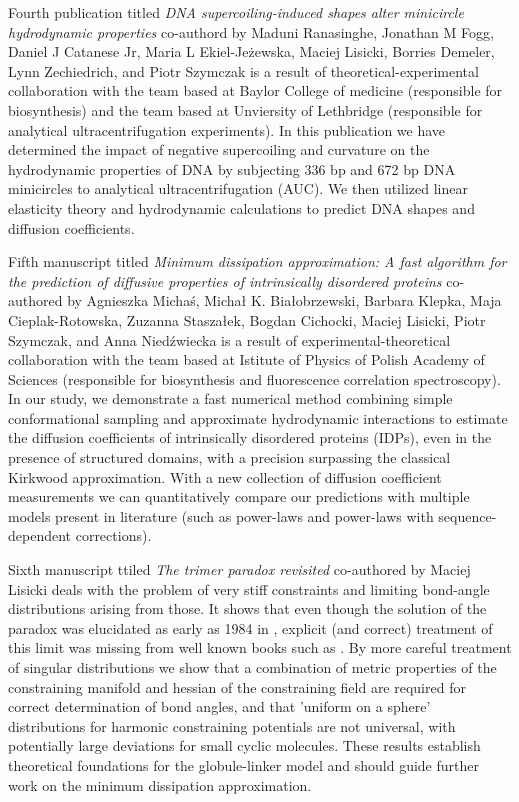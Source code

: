 \documentclass{doctoral}
\begin{document}
Fourth publication titled \emph{DNA supercoiling-induced shapes alter minicircle hydrodynamic properties} co-authord by Maduni Ranasinghe, Jonathan M Fogg, Daniel J Catanese Jr, Maria L Ekiel-Jeżewska, Maciej Lisicki, Borries Demeler, Lynn Zechiedrich, and Piotr Szymczak is a result of theoretical-experimental collaboration with the team based at Baylor College of medicine (responsible for biosynthesis) and the team based at Unviersity of Lethbridge (responsible for analytical ultracentrifugation experiments).
In this publication we have determined the impact of negative supercoiling and curvature on the hydrodynamic properties of DNA by subjecting 336 bp and 672 bp DNA minicircles to analytical ultracentrifugation (AUC).
We then utilized linear elasticity theory and hydrodynamic calculations to predict DNA shapes and diffusion coefficients.

Fifth manuscript titled \emph{Minimum dissipation approximation: A fast algorithm for the prediction of diffusive properties of intrinsically disordered proteins} co-authored by Agnieszka Michaś, Michał K.
Białobrzewski, Barbara Klepka, Maja Cieplak-Rotowska, Zuzanna Staszałek, Bogdan Cichocki, Maciej Lisicki, Piotr Szymczak, and Anna Niedźwiecka is a result of experimental-theoretical collaboration with the team based at Istitute of Physics of Polish Academy of Sciences (responsible for biosynthesis and fluorescence correlation spectroscopy).
In our study, we demonstrate a fast numerical method combining simple conformational sampling and approximate hydrodynamic interactions to estimate the diffusion coefficients of intrinsically disordered proteins (IDPs), even in the presence of structured domains, with a precision surpassing the classical Kirkwood approximation.
With a new collection of diffusion coefficient measurements we can quantitatively compare our predictions with multiple models present in literature (such as power-laws and power-laws with sequence-dependent corrections).

Sixth manuscript ttiled \emph{The trimer paradox revisited} co-authored by Maciej Lisicki deals with the problem of very stiff constraints and limiting bond-angle distributions arising from those.
It shows that even though the solution of the paradox was elucidated as early as 1984 in \textcite{van_Kampen_1984}, explicit (and correct) treatment of this limit was missing from well known books such as \textcite{Frenkel_2002}.
By more careful treatment of singular distributions we show that a combination of metric properties of the constraining manifold and hessian of the constraining field are required for correct determination of bond angles, and that 'uniform on a sphere' distributions for harmonic constraining potentials are not universal, with potentially large deviations for small cyclic molecules.
These results establish theoretical foundations for the globule-linker model and should guide further work on the minimum dissipation approximation.
\end{document}
